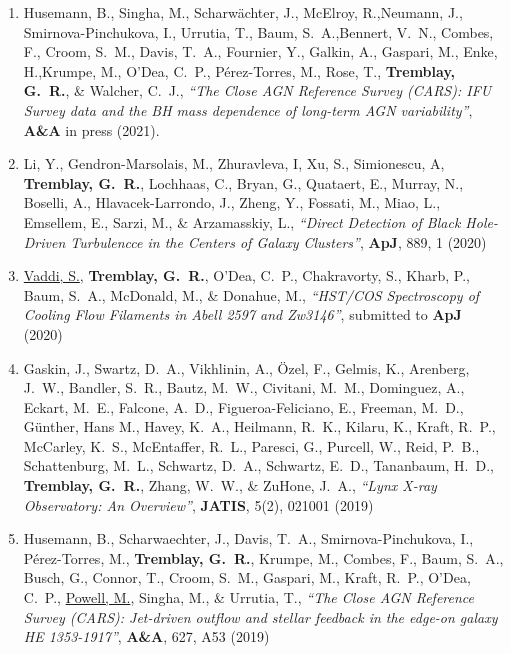 \documentclass[11pt]{article}
\begin{document}
\begin{enumerate}
\item Husemann, B., Singha, M., Scharw\"{a}chter, J., McElroy, R.,Neumann, J.,
Smirnova-Pinchukova, I., Urrutia, T., Baum, S.~A.,Bennert, V.~N., Combes, F., Croom, S.~M.,
Davis, T.~A., Fournier, Y., Galkin, A., Gaspari, M., Enke, H.,Krumpe, M., O'Dea, C.~P.,
P\'{e}rez-Torres, M., Rose, T., \textbf{Tremblay, G.~R.}, \& Walcher, C.~J., \textit{``The Close AGN Reference Survey (CARS): IFU Survey data and the BH mass dependence of long-term AGN variability''},
\textbf{A\&A} in press (2021).

\item Li, Y., Gendron-Marsolais, M., Zhuravleva, I, Xu, S.,
Simionescu, A, \textbf{Tremblay, G.~R.}, Lochhaas, C., Bryan, G.,
Quataert, E., Murray, N., Boselli, A., Hlavacek-Larrondo, J.,
Zheng, Y., Fossati, M., Miao, L., Emsellem, E., Sarzi, M.,
\& Arzamasskiy, L., \textit{``Direct Detection of Black Hole-Driven Turbulencce
in the Centers of Galaxy Clusters''}, \textbf{ApJ}, 889, 1 (2020)

\item \uline{Vaddi, S.}, \textbf{Tremblay, G.~R.}, O'Dea, C.~P.,
Chakravorty, S., Kharb, P., Baum, S.~A., McDonald, M., \& Donahue, M.,
\textit{``HST/COS Spectroscopy of Cooling Flow Filaments in Abell 2597 and Zw3146''},
submitted to \textbf{ApJ} (2020)


\item Gaskin, J., Swartz, D.~A., Vikhlinin, A., \"{O}zel, F.,
Gelmis, K., Arenberg, J.~W., Bandler, S.~R., Bautz, M.~W., Civitani, M.~M.,
Dominguez, A., Eckart, M.~E., Falcone, A.~D., Figueroa-Feliciano, E.,
Freeman, M.~D., G\"{u}nther, Hans M., Havey, K.~A., Heilmann, R.~K.,
Kilaru, K., Kraft, R.~P., McCarley, K.~S., McEntaffer, R.~L.,
Paresci, G., Purcell, W., Reid, P.~B., Schattenburg, M.~L.,
Schwartz, D.~A., Schwartz, E.~D., Tananbaum, H.~D.,
\textbf{Tremblay, G.~R.}, Zhang, W.~W., \& ZuHone, J.~A.,
\textit{``Lynx X-ray Observatory: An Overview''}, \textbf{JATIS}, 5(2), 021001 (2019)

\item Husemann, B., Scharwaechter, J., Davis, T.~A., Smirnova-Pinchukova, I., P\'{e}rez-Torres, M., \textbf{Tremblay, G.~R.},
 Krumpe, M., Combes, F., Baum, S.~A., Busch, G., Connor, T.,
 Croom, S.~M., Gaspari, M., Kraft, R.~P., O'Dea, C.~P., \uline{Powell, M.}, Singha, M., \& Urrutia, T., \textit{``The Close AGN Reference Survey (CARS): Jet-driven outflow and stellar feedback in the edge-on galaxy HE 1353-1917''}, \textbf{A\&A}, 627, A53 (2019)


\end{enumerate}
\end{document}
